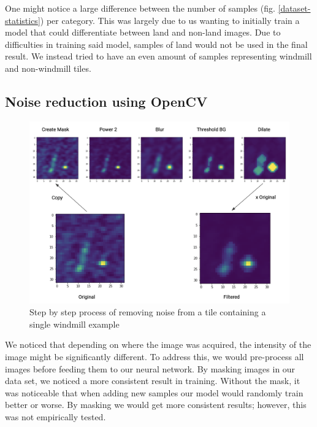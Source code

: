 One might notice a large difference between the number of samples (fig. \ref{dataset-statistics}) per category. This was largely due to us wanting to initially train a model that could differentiate between land and non-land images. Due to difficulties in training said model, samples of land would not be used in the final result. We instead tried to have an even amount of samples representing windmill and non-windmill tiles.

\subsection{Noise reduction using OpenCV}

\begin{figure}[ht]
\begin{center}
\centerline{\includegraphics[width=\columnwidth]{images/noise-reduction.png}}
\caption{Step by step process of removing noise from a tile containing a single windmill example}
\label{noise-reduction}
\end{center}
\end{figure}

We noticed that depending on where the image was acquired, the intensity of the image might be significantly different. To address this, we would pre-process all images before feeding them to our neural network. By masking images in our data set, we noticed a more consistent result in training. Without the mask, it was noticeable that when adding new samples our model would randomly train better or worse. By masking we would get more consistent results; however, this was not empirically tested.\\

